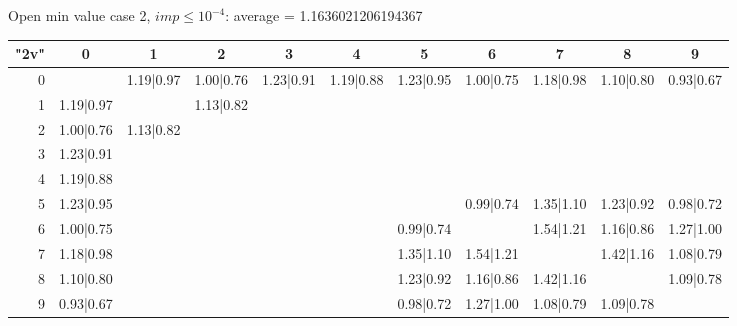 \begin{table}
		\vspace{0.6cm}
	
		Open min value case 2, $imp\leq10^{-4}$: average = 1.1636021206194367
	
	\vspace{0.6cm}
	
	\begin{tabular}{|r||c|c|c|c|c|c|c|c|c|c|}\hline
		{\bf "2v"} & 0 & 1 & 2 & 3 & 4 & 5 & 6 & 7 & 8 & 9 \\\hline\hline
	0 & &1.19|0.97 &1.00|0.76 &1.23|0.91 &1.19|0.88 &1.23|0.95 &1.00|0.75 &1.18|0.98 &1.10|0.80 &0.93|0.67  \\\hline
	1 &1.19|0.97 & &1.13|0.82 & & & & & & &  \\\hline
	2 &1.00|0.76 &1.13|0.82 & & & & & & & &  \\\hline
	3 &1.23|0.91 & & & & & & & & &  \\\hline
	4 &1.19|0.88 & & & & & & & & &  \\\hline
	5 &1.23|0.95 & & & & & &0.99|0.74 &1.35|1.10 &1.23|0.92 &0.98|0.72  \\\hline
	6 &1.00|0.75 & & & & &0.99|0.74 & &1.54|1.21 &1.16|0.86 &1.27|1.00  \\\hline
	7 &1.18|0.98 & & & & &1.35|1.10 &1.54|1.21 & &1.42|1.16 &1.08|0.79  \\\hline
	8 &1.10|0.80 & & & & &1.23|0.92 &1.16|0.86 &1.42|1.16 & &1.09|0.78  \\\hline
	9 &0.93|0.67 & & & & &0.98|0.72 &1.27|1.00 &1.08|0.79 &1.09|0.78 &  \\\hline
	\end{tabular}
\end{table}

\clearpage


